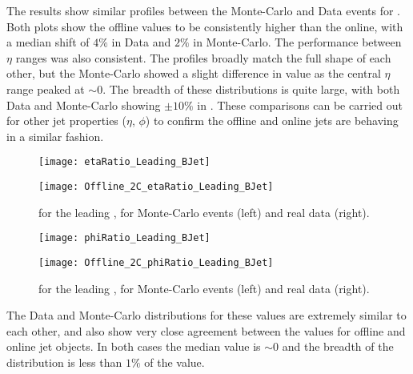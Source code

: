 		 The results show similar profiles between the Monte-Carlo and Data events for \dptpt. Both plots show the offline \pt values to be consistently higher than the online, with a median shift of $4\%$ in Data and $2\%$ in Monte-Carlo. The performance between $\eta$ ranges was also consistent. The profiles broadly match the full shape of each other, but the Monte-Carlo showed a slight difference in \dptpt value as the central $\eta$ range peaked at $\sim0$. The breadth of these distributions is quite large, with both Data and Monte-Carlo showing $\pm10\%$ in \dptpt.
		 \newpage
		These comparisons can be carried out for other jet properties ($\eta$, $\phi$) to confirm the offline and online jets are behaving in a similar fashion.

		\begin{figure}[h]
			\centering
			\begin{minipage}[h]{0.48\linewidth}
				\texttt{[image: etaRatio\_Leading\_BJet]}

			\end{minipage}
			\quad
			\begin{minipage}[h]{0.48\linewidth}
				\texttt{[image: Offline\_2C\_etaRatio\_Leading\_BJet]}
			\end{minipage}
			\caption{\dee for the leading \bjet, for Monte-Carlo events (left) and real data (right).}
			\label{fig:O:leadingbeta}
		\end{figure}

		\begin{figure}[h]
			\centering
			\begin{minipage}[h]{0.48\linewidth}
				\texttt{[image: phiRatio\_Leading\_BJet]}

			\end{minipage}
			\quad
			\begin{minipage}[h]{0.48\linewidth}
				\texttt{[image: Offline\_2C\_phiRatio\_Leading\_BJet]}
			\end{minipage}
			\caption{\dphph for the leading \bjet, for Monte-Carlo events (left) and real data (right).}
			\label{fig:O:leadingbphi}
		\end{figure}

		The Data and Monte-Carlo distributions for these values are extremely similar to each other, and also show very close agreement between the values for offline and online jet objects. In both cases the median \dxx value is $\sim0$ and the breadth of the distribution is less than $1\%$ of the value.


